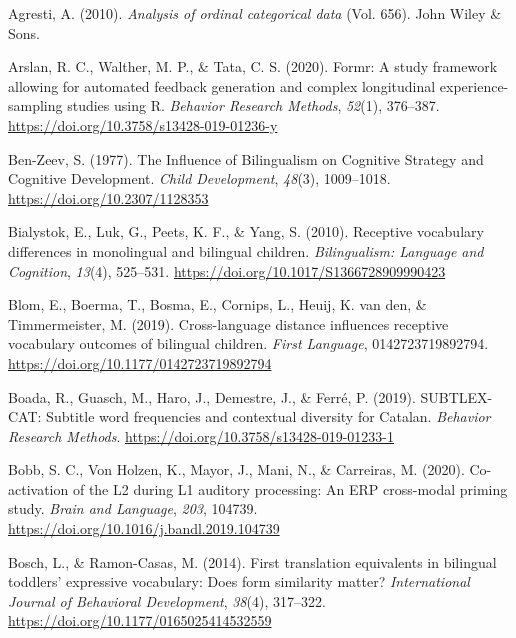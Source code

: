 \documentclass[
  english,
  man,man,floatsintext]{apa6}
\newlength{\cslhangindent}
\newenvironment{cslreferences}%
  {\setlength{\parindent}{0pt}%
  \everypar{\setlength{\hangindent}{\cslhangindent}}\ignorespaces}%
  {\par}
\begin{document}
\hypertarget{refs}{}
\begin{cslreferences}
\leavevmode\hypertarget{ref-agresti_analysis_2010}{}%
Agresti, A. (2010). \emph{Analysis of ordinal categorical data} (Vol. 656). John Wiley \& Sons.

\leavevmode\hypertarget{ref-arslan_formr_2020}{}%
Arslan, R. C., Walther, M. P., \& Tata, C. S. (2020). Formr: A study framework allowing for automated feedback generation and complex longitudinal experience-sampling studies using R. \emph{Behavior Research Methods}, \emph{52}(1), 376--387. \url{https://doi.org/10.3758/s13428-019-01236-y}

\leavevmode\hypertarget{ref-ben-zeev_influence_1977}{}%
Ben-Zeev, S. (1977). The Influence of Bilingualism on Cognitive Strategy and Cognitive Development. \emph{Child Development}, \emph{48}(3), 1009--1018. \url{https://doi.org/10.2307/1128353}

\leavevmode\hypertarget{ref-bialystok_receptive_2010}{}%
Bialystok, E., Luk, G., Peets, K. F., \& Yang, S. (2010). Receptive vocabulary differences in monolingual and bilingual children. \emph{Bilingualism: Language and Cognition}, \emph{13}(4), 525--531. \url{https://doi.org/10.1017/S1366728909990423}

\leavevmode\hypertarget{ref-blom_cross-language_2019}{}%
Blom, E., Boerma, T., Bosma, E., Cornips, L., Heuij, K. van den, \& Timmermeister, M. (2019). Cross-language distance influences receptive vocabulary outcomes of bilingual children. \emph{First Language}, 0142723719892794. \url{https://doi.org/10.1177/0142723719892794}

\leavevmode\hypertarget{ref-boada_subtlex-cat_2019}{}%
Boada, R., Guasch, M., Haro, J., Demestre, J., \& Ferré, P. (2019). SUBTLEX-CAT: Subtitle word frequencies and contextual diversity for Catalan. \emph{Behavior Research Methods}. \url{https://doi.org/10.3758/s13428-019-01233-1}

\leavevmode\hypertarget{ref-bobb_co-activation_2020}{}%
Bobb, S. C., Von Holzen, K., Mayor, J., Mani, N., \& Carreiras, M. (2020). Co-activation of the L2 during L1 auditory processing: An ERP cross-modal priming study. \emph{Brain and Language}, \emph{203}, 104739. \url{https://doi.org/10.1016/j.bandl.2019.104739}

\leavevmode\hypertarget{ref-bosch_first_2014}{}%
Bosch, L., \& Ramon-Casas, M. (2014). First translation equivalents in bilingual toddlers' expressive vocabulary: Does form similarity matter? \emph{International Journal of Behavioral Development}, \emph{38}(4), 317--322. \url{https://doi.org/10.1177/0165025414532559}


\end{cslreferences}
\end{document}
